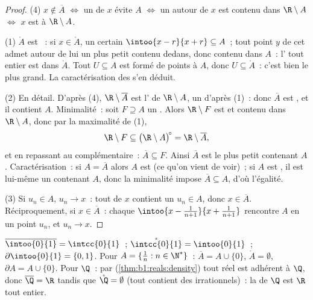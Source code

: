 \begin{proof}
(4) $x \notin \overline A$ $\iff$ un  de $x$ évite $A$
$\iff$ un  autour de $x$ est contenu dans $\R \setminus A$
$\iff$ $x$ est  à $\R \setminus A$.

(1) $\mathring A$ est ~: si $x \in \mathring A$, un certain
$\intoo{x-r}{x+r} \subseteq A$~; tout point $y$ de cet 
admet autour de lui un  plus petit contenu dedans, donc
contenu dans $A$~: l' tout entier est dans $\mathring A$.
Tout  $U \subseteq A$ est formé de points  à $A$, donc
$U \subseteq \mathring A$~: c'est bien le plus grand. La
caractérisation des  s'en déduit.

(2) En détail. D'après (4), $\R \setminus \overline A$ est
l' de $\R \setminus A$, un  d'après (1)~: donc
$\overline A$ est , et il contient $A$. Minimalité~: soit
$F \supseteq A$ un . Alors $\R \setminus F$ est  et contenu
dans $\R \setminus A$, donc par la maximalité de (1),
\[
\R \setminus F \subseteq \bigl(\R \setminus A\bigr)^{\!\circ}
= \R \setminus \overline A ,
\]
et en repassant au complémentaire~: $\overline A \subseteq F$. Ainsi
$\overline A$ est le plus petit  contenant $A$. Caractérisation~:
si $A = \overline A$ alors $A$ est  (ce qu'on vient de voir)~; si
$A$ est , il est lui-même un  contenant $A$, donc la
minimalité impose $\overline A \subseteq A$, d'où l'égalité.

(3) Si $u_n \in A$, $u_n \to x$~: tout  de $x$ contient un
$u_n \in A$, donc $x \in \overline A$. Réciproquement, si $x \in
\overline A$~: chaque  $\intoo{x - \frac{1}{n+1}}{x +
\frac{1}{n+1}}$ rencontre $A$ en un point $u_n$, et $u_n \to x$.
\end{proof}

\begin{example}\label{ex:b1:topology:closureexamples}
$\overline{\intoo{0}{1}} = \intcc{0}{1}$~;
$\mathring{\intcc{0}{1}} = \intoo{0}{1}$~; $\partial\intoo{0}{1} =
\{0, 1\}$. Pour $A = \{\frac 1n : n \in \N^*\}$~: $\overline A = A
\cup \{0\}$, $\mathring A = \emptyset$, $\partial A = A \cup \{0\}$.
Pour $\Q$~: par  (\cref{thm:b1:reals:density}) tout réel est
adhérent à $\Q$, donc $\overline{\Q} = \R$ tandis que $\mathring{\Q} =
\emptyset$ (tout  contient des irrationnels)~: la 
de $\Q$ est $\R$ tout entier.
\end{example}

